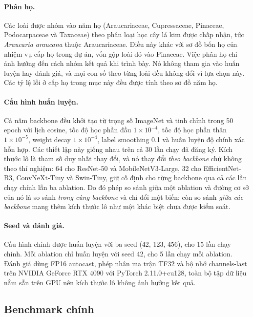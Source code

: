 \paragraph{Phân họ.} Các loài được nhóm vào năm họ (Araucariaceae,
Cupressaceae, Pinaceae, Podocarpaceae và Taxaceae) theo phân loại học cây lá
kim được chấp nhận, tức \textit{Araucaria araucana} thuộc Araucariaceae. Điều
này khác với sơ đồ bốn họ của nhiệm vụ cấp họ trong dự án, vốn gộp loài đó vào
Pinaceae. Việc phân họ chỉ ảnh hưởng đến cách nhóm kết quả khi trình bày. Nó không
tham gia vào huấn luyện hay đánh giá, và mọi con số theo từng loài đều
không đổi vì lựa chọn này. Các tỷ lệ lỗi ở cấp họ trong mục này đều được tính
theo sơ đồ năm họ.

\paragraph{Cấu hình huấn luyện.} Cả năm backbone đều khởi tạo từ trọng số
ImageNet và tinh chỉnh trong 50 epoch với lịch cosine, tốc độ học phần đầu
$1\times10^{-4}$, tốc độ học phần thân $1\times10^{-5}$, weight decay
$1\times10^{-4}$, label smoothing 0.1 và huấn luyện độ chính xác hỗn hợp. Các
thiết lập này giống nhau trên cả 30 lần chạy đã đăng ký. Kích thước lô là
tham số duy nhất thay đổi, và nó thay đổi \emph{theo backbone} chứ không theo
thí nghiệm: 64 cho ResNet-50 và MobileNetV3-Large, 32 cho EfficientNet-B3,
ConvNeXt-Tiny và Swin-Tiny, giữ cố định cho từng backbone qua cả các lần chạy
chính lẫn ba ablation. Do đó phép so sánh giữa một ablation và đường cơ sở của
nó là so sánh \emph{trong cùng backbone} và chỉ đổi một biến; còn so sánh
\emph{giữa các backbone} mang thêm kích thước lô như một khác biệt chưa được
kiểm soát.

\paragraph{Seed và đánh giá.} Cấu hình chính được huấn luyện với ba seed
(42, 123, 456), cho 15 lần chạy chính. Mỗi ablation chỉ huấn luyện với seed 42,
cho 5 lần chạy mỗi ablation. Đánh giá dùng FP16 autocast, phép nhân ma trận
TF32 và bộ nhớ channels-last trên NVIDIA GeForce RTX 4090 với PyTorch
2.11.0+cu128, toàn bộ tập dữ liệu nằm sẵn trên GPU nên kích thước lô không ảnh
hưởng kết quả.

\subsection{Benchmark chính}
\label{vi:sec:results:benchmark}


